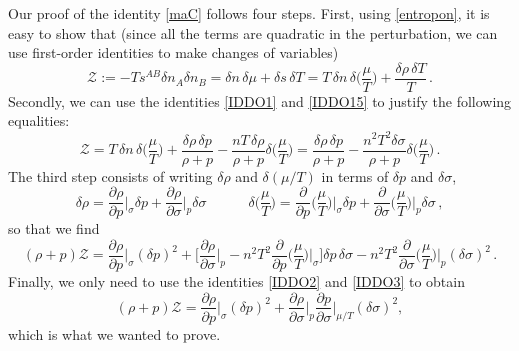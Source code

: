 \documentclass[a4paper, amsfonts, amssymb, amsmath, reprint, showkeys, nofootinbib, twoside, onecolumn,notitlepage]{revtex4-1}
\newcommand{\spc}{\quad \quad \quad}
\begin{document}
Our proof of the identity \eqref{maC} follows four steps. First, using \eqref{entropon}, it is easy to show that (since all the terms are quadratic in the perturbation, we can use first-order identities to make changes of variables)
\begin{equation}\label{Ilprimoordine}
\mathcal{Z} := -Ts^{AB} \delta n_A \delta n_B = \delta n \, \delta \mu + \delta s \, \delta T =  T \, \delta n \, \delta \bigg( \dfrac{\mu}{T} \bigg) + \dfrac{\delta \rho \, \delta T}{T} \, .
\end{equation}
Secondly, we can use the identities \eqref{IDDO1} and \eqref{IDDO15} to justify the following equalities:
\begin{equation}
\mathcal{Z} = T \, \delta n \, \delta \bigg( \dfrac{\mu}{T} \bigg) + \dfrac{\delta \rho \, \delta p}{\rho + p} - \dfrac{nT \, \delta \rho}{\rho +p} \delta \bigg( \dfrac{\mu}{T}  \bigg) = \dfrac{\delta \rho \, \delta p}{\rho + p} - \dfrac{n^2 T^2 \delta \sigma}{\rho +p}  \delta \bigg( \dfrac{\mu}{T} \bigg) \, .
\end{equation}
The third step consists of writing $\delta \rho$ and $\delta(\mu/T)$ in terms of $\delta p$ and $\delta \sigma$,
\begin{equation}
\delta \rho = \dfrac{\partial \rho}{\partial p}\bigg|_\sigma \delta p + \dfrac{\partial \rho}{\partial \sigma}\bigg|_p \delta \sigma  \spc \delta \bigg( \dfrac{\mu}{T} \bigg) = \dfrac{\partial }{\partial p} \bigg( \dfrac{\mu}{T} \bigg)\bigg|_\sigma \delta p + \dfrac{\partial }{\partial \sigma}\bigg( \dfrac{\mu}{T} \bigg)\bigg|_p \delta \sigma \, ,
\end{equation}
so that we find
\begin{equation}
(\rho + p)\mathcal{Z} = \dfrac{\partial \rho}{\partial p}\bigg|_\sigma (\delta p)^2 + \bigg[ \dfrac{\partial \rho}{\partial \sigma}\bigg|_p - n^2 T^2 \dfrac{\partial }{\partial p} \bigg( \dfrac{\mu}{T} \bigg)\bigg|_\sigma \bigg] \delta p \, \delta \sigma - n^2 T^2 \dfrac{\partial }{\partial \sigma}\bigg( \dfrac{\mu}{T} \bigg)\bigg|_p (\delta \sigma)^2 \, .
\end{equation}
Finally, we only need to use the identities \eqref{IDDO2} and \eqref{IDDO3} to obtain
\begin{equation}
(\rho + p)\mathcal{Z} = \dfrac{\partial \rho}{\partial p}\bigg|_\sigma (\delta p)^2 +  \dfrac{\partial \rho}{\partial \sigma} \bigg|_p  \dfrac{\partial p}{\partial \sigma}\bigg|_{\mu/T} (\delta \sigma)^2,
\end{equation}
which is what we wanted to prove.
\end{document}

